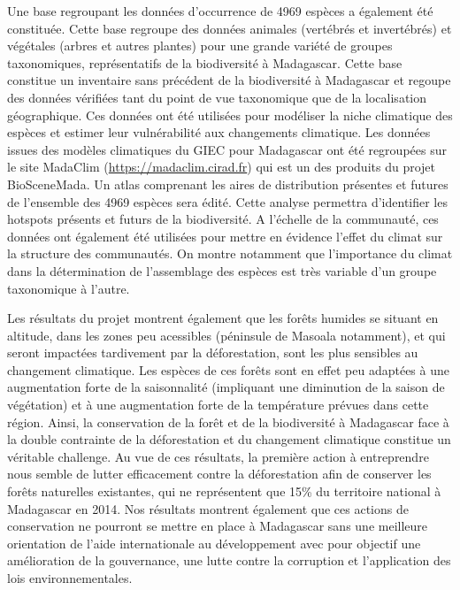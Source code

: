 \documentclass[12pt,]{article}
\begin{document}
Une base regroupant les données d'occurrence de 4969 espèces a également
été constituée. Cette base regroupe des données animales (vertébrés et
invertébrés) et végétales (arbres et autres plantes) pour une grande
variété de groupes taxonomiques, représentatifs de la biodiversité à
Madagascar. Cette base constitue un inventaire sans précédent de la
biodiversité à Madagascar et regoupe des données vérifiées tant du point
de vue taxonomique que de la localisation géographique. Ces données ont
été utilisées pour modéliser la niche climatique des espèces et estimer
leur vulnérabilité aux changements climatique. Les données issues des
modèles climatiques du GIEC pour Madagascar ont été regroupées sur le
site MadaClim (\url{https://madaclim.cirad.fr}) qui est un des produits
du projet BioSceneMada. Un atlas comprenant les aires de distribution
présentes et futures de l'ensemble des 4969 espèces sera édité. Cette
analyse permettra d'identifier les hotspots présents et futurs de la
biodiversité. A l'échelle de la communauté, ces données ont également
été utilisées pour mettre en évidence l'effet du climat sur la structure
des communautés. On montre notamment que l'importance du climat dans la
détermination de l'assemblage des espèces est très variable d'un groupe
taxonomique à l'autre.

Les résultats du projet montrent également que les forêts humides se
situant en altitude, dans les zones peu acessibles (péninsule de Masoala
notamment), et qui seront impactées tardivement par la déforestation,
sont les plus sensibles au changement climatique. Les espèces de ces
forêts sont en effet peu adaptées à une augmentation forte de la
saisonnalité (impliquant une diminution de la saison de végétation) et à
une augmentation forte de la température prévues dans cette région.
Ainsi, la conservation de la forêt et de la biodiversité à Madagascar
face à la double contrainte de la déforestation et du changement
climatique constitue un véritable challenge. Au vue de ces résultats, la
première action à entreprendre nous semble de lutter efficacement contre
la déforestation afin de conserver les forêts naturelles existantes, qui
ne représentent que 15\% du territoire national à Madagascar en 2014.
Nos résultats montrent également que ces actions de conservation ne
pourront se mettre en place à Madagascar sans une meilleure orientation
de l'aide internationale au développement avec pour objectif une
amélioration de la gouvernance, une lutte contre la corruption et
l'application des lois environnementales.
\end{document}
